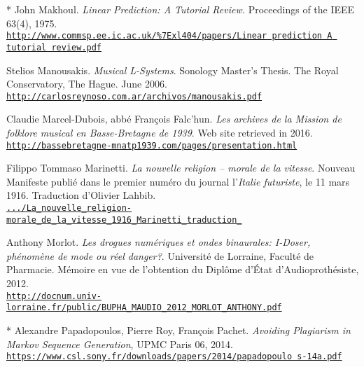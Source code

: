 \begin{thebibliography}{99}
	* John Makhoul. \textit{Linear Prediction: A Tutorial Review.} Proceedings of the IEEE 63(4), 1975.\\ \href{https://www.commsp.ee.ic.ac.uk/\%7Exl404/papers/Linear\%20prediction\%20A\%20tutorial\%20review.pdf}{\scriptsize{\texttt{http://www.commsp.ee.ic.ac.uk/\%7Exl404/papers/Linear prediction A tutorial review.pdf}}} \normalsize{}
		 
	Stelios Manousakis. \textit{Musical L-Systems}. Sonology Master's Thesis. The Royal Conservatory, The Hague. June 2006.\\ \href{http://carlosreynoso.com.ar/archivos/manousakis.pdf}{\scriptsize{\texttt{http://carlosreynoso.com.ar/archivos/manousakis.pdf}}} \normalsize{}
	
	Claudie Marcel-Dubois, abb\'e François Falc'hun. \textit{Les archives de la Mission de folklore musical en Basse-Bretagne de 1939}. Web site retrieved in 2016.\\ 
	\href{http://bassebretagne-mnatp1939.com/pages/presentation.html}{\scriptsize{\texttt{http://bassebretagne-mnatp1939.com/pages/presentation.html}}} \normalsize{}
	
	Filippo Tommaso Marinetti. \textit{La nouvelle religion -- morale de la vitesse}. Nouveau Manifeste publi\'{e} dans le premier num\'{e}ro du journal l'\textit{Italie futuriste}, le 11 mars 1916. Traduction d'Olivier Lahbib.\\ 
	\href{https://www.academia.edu/12024655/La\_nouvelle\_religion-morale\_de\_la\_vitesse\_1916\_Marinetti\_traduction\_}{\scriptsize{\texttt{.../La\_nouvelle\_religion-morale\_de\_la\_vitesse\_1916\_Marinetti\_traduction\_}}} \normalsize{}
	
	
	Anthony Morlot. \textit{Les drogues num\'eriques et ondes
binaurales: I-Doser, ph\'enom\`ene de mode ou r\'eel danger?}. Universit\'e de Lorraine, Facult\'e de Pharmacie. M\'emoire en vue de l'obtention du Dipl\^ome d'\'Etat d'Audioproth\'esiste, 2012.\\ 
	\href{http://docnum.univ-lorraine.fr/public/BUPHA\_MAUDIO\_2012\_MORLOT\_ANTHONY.pdf}{\scriptsize{\texttt{http://docnum.univ-lorraine.fr/public/BUPHA\_MAUDIO\_2012\_MORLOT\_ANTHONY.pdf}}} \normalsize{}
	
	* Alexandre Papadopoulos, Pierre Roy, Fran\c cois Pachet. \textit{Avoiding Plagiarism in Markov Sequence Generation}, UPMC Paris 06, 2014.\\ \href{https://www.csl.sony.fr/downloads/papers/2014/papadopoulo s-14a.pdf}{\scriptsize{\texttt{https://www.csl.sony.fr/downloads/papers/2014/papadopoulo s-14a.pdf}}} \normalsize{}
	

\end{thebibliography}
